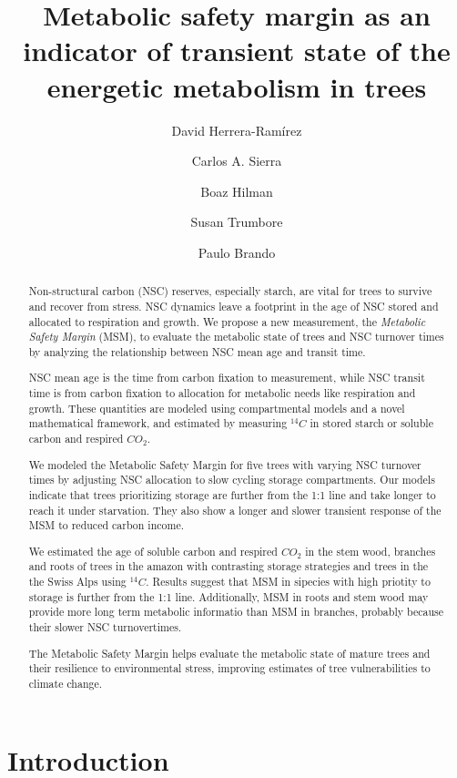 \documentclass{article}
\title{Metabolic safety margin as an indicator of transient state of the energetic metabolism in trees}
\author[1*]{David Herrera-Ram\'irez}
\author[1]{Carlos A. Sierra}
\author[1]{Boaz Hilman}
\author[1]{Susan Trumbore}
\author[2]{Paulo Brando}
\affil[1]{Max Planck Institute for Biogeochemistry, Hans-Kn{\"o}ll-Str 10, 07745 Jena}
\affil[2]{Yale School of the Environment}
\begin{document}
\maketitle

\begin{abstract}

Non-structural carbon (NSC) reserves, especially starch, are vital for trees to survive and recover from stress. NSC dynamics leave a footprint in the age of NSC stored and allocated to respiration and growth. We propose a new measurement, the \textit{Metabolic Safety Margin} (MSM), to evaluate the metabolic state of trees and NSC turnover times by analyzing the relationship between NSC mean age and transit time.

NSC mean age is the time from carbon fixation to measurement, while NSC transit time is from carbon fixation to allocation for metabolic needs like respiration and growth. These quantities are modeled using compartmental models and a novel mathematical framework, and estimated by measuring 
$^{14}C$ in stored starch or soluble carbon and respired $CO_{2}$.

We modeled the Metabolic Safety Margin for five trees with varying NSC turnover times by adjusting NSC allocation to slow cycling storage compartments. Our models indicate that trees prioritizing storage are further from the 1:1 line and take longer to reach it under starvation. They also show a longer and slower transient response of the MSM to reduced carbon income.

We estimated the age of soluble carbon and respired $CO_{2}$ in the stem wood, branches and roots of trees in the amazon with contrasting storage strategies and trees in the the Swiss Alps using $^{14}C$. Results suggest that MSM in sipecies with high priotity to storage is further from the 1:1 line. Additionally, MSM in roots and stem wood may provide more long term metabolic informatio than MSM in branches, probably because their slower NSC turnovertimes. 

The Metabolic Safety Margin helps evaluate the metabolic state of mature trees and their resilience to environmental stress, improving estimates of tree vulnerabilities to climate change.

\end{abstract}



\section{Introduction}
\end{document}
